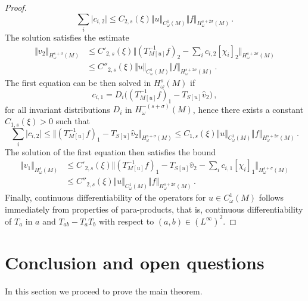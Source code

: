 \documentclass[11pt]{amsart}
\begin{document}
\begin{proof}
$$\sum_i \vert c_{i,2} \vert  \leq  C_{2,s} (\xi)  \Vert u \Vert_{C^1_\omega(M)} \Vert f \Vert_{H^{s+2\sigma}_\omega(M)}\,.
$$
The solution satisfies the estimate 
$$
\begin{aligned}
\Vert  v_2 \Vert_{H^{s + \sigma}_\omega(M)} &\leq  C'_{2,s} (\xi)  \Vert (T^{-1}_{M[u]}  f )_2- \sum_i  c_{i,2} [\chi_{i}]_2\Vert_{H^{s + 2\sigma}_\omega(M)}
\\ & \leq  C''_{2,s} (\xi)  \Vert u \Vert_{C^1_\omega(M)}  \Vert f \Vert_{H^{s + 2\sigma}_\omega(M)} \,.
\end{aligned}
$$
The first equation can be then solved in $H^s_\omega(M)$  if 
$$
c_{i,1} = D_i \Big (  (T^{-1}_{M[u]}  f )_1 - T_{S[u]}  \hat v_2\Big)\,,
$$
for all invariant distributions 
$D_i$ in $H^{-(s+ \sigma)}_\omega(M)$, hence there exists a constant $C_{1,s}(\xi) >0$ such that 
$$
\sum_i \vert c_{i,2} \vert \leq \Vert  (T^{-1}_{M[u]}  f )_1 - T_{S[u]}  \hat v_2   \Vert_{H^{s+\sigma}_\omega(M)}  \leq  C_{1,s} (\xi)  \Vert u \Vert_{C^1_\omega(M)} \Vert f \Vert_{H^{s+2\sigma}_\omega(M)}\,.
$$
The solution of the first equation then satisfies the bound
$$
\begin{aligned}
\Vert  v_1 \Vert_{H^{s}_\omega(M)} &\leq  C'_{2,s} (\xi)  \Vert  (T^{-1}_{M[u]}  f )_1 - T_{S[u]}  \hat v_2-  \sum_i  c_{i,1} [\chi_{i}]_1\Vert_{H^{s + \sigma}_\omega(M)}
\\ & \leq  C''_{2,s} (\xi)  \Vert u \Vert_{C^1_\omega(M)}  \Vert f \Vert_{H^{s + 2\sigma}_\omega(M)} \,.
\end{aligned}
$$
Finally, continuous differentiability of the operators for $u\in C^1_\omega(M)$  follows immediately from properties of para-products, that is, continuous differentiability of 
$T_a$ in $a$ and $T_{ab}- T_aT_ b$ with respect to $(a, b)\in (L^{\infty})^2$.
\end{proof}

\section{Conclusion and open questions}

In this section we proceed to prove the main theorem.
\end{document}
